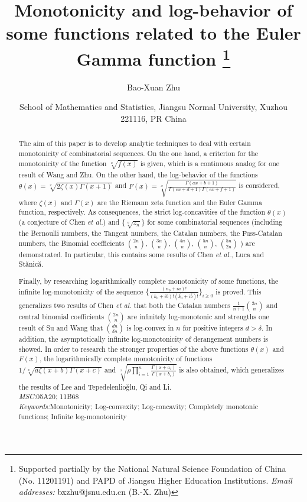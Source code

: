 \documentclass[12pt,reqno]{article}
\title{Monotonicity and log-behavior of some functions related to the Euler Gamma function
\thanks{Supported partially by the National Natural Science Foundation of China (No.
11201191) and PAPD of Jiangsu Higher Education Institutions.
\newline\hspace*{5mm}
   {\it Email addresses:} bxzhu@jsnu.edu.cn (B.-X. Zhu)}}
\author{Bao-Xuan Zhu}
\date{\footnotesize School of Mathematics and Statistics,
         Jiangsu Normal University,
         Xuzhou 221116, PR China}
\theoremstyle{definition}
\numberwithin{equation}{section}
\begin{document}
\maketitle

\begin{abstract}
The aim of this paper is to develop analytic techniques to deal with
certain monotonicity of combinatorial sequences. On the one hand, a
criterion for the monotonicity of the function $\sqrt[x]{f(x)}$ is
given, which is a continuous analog for one result of Wang and Zhu.
On the other hand, the log-behavior of the functions
$\theta(x)=\sqrt[x]{2 \zeta(x)\Gamma(x+1)}$ and
$F(x)=\sqrt[x]{\frac{\Gamma(ax+b+1)}{\Gamma(c x+d+1)\Gamma(e
x+f+1)}}$ is considered, where $\zeta(x)$ and $\Gamma(x)$ are the
Riemann zeta function and the Euler Gamma function, respectively. As
consequences, the strict log-concavities of the function $\theta(x)$
(a conjecture of Chen {\it et al.}) and $\{\sqrt[n]{z_n}\}$ for some
combinatorial sequences (including the Bernoulli numbers, the
Tangent numbers, the Catalan numbers, the Fuss-Catalan numbers, the
Binomial coefficients $\binom{2n}{n}$, $\binom{3n}{n}$,
$\binom{4n}{n}$, $\binom{5n}{n}$, $\binom{5n}{2n}$ ) are
demonstrated. In particular, this contains some results of Chen {\it
et al.}, Luca and St\u{a}nic\u{a}.

Finally, by researching logarithmically complete monotonicity of
some functions, the infinite log-monotonicity of the sequence
$\{\frac{(n_{0}+ia)!}{(k_0+ib)!(\overline{k_0}+i\overline{b})!}\}_{i\geq0}$
is proved. This generalizes two results of Chen {\it et al.} that
both the Catalan numbers $\frac{1}{n+1}\binom{2n}{n}$ and central
binomial coefficients $\binom{2n}{n}$ are infinitely log-monotonic
and strengths one result of Su and Wang that $\binom{dn}{\delta n}$
is log-convex in $n$ for positive integers $d>\delta$. In addition,
the asymptotically infinite log-monotonicity of derangement numbers
is showed. In order to research the stronger properties of the above
functions $\theta(x)$ and $F(x)$, the logarithmically complete
monotonicity of functions $1/\sqrt[x]{a \zeta(x+b)\Gamma(x+c)}$ and
$\sqrt[x]{\rho\prod_{i=1}^n\frac{\Gamma(x+a_i)}{\Gamma(x+b_i)}}$ is
also obtained, which generalizes the results of Lee and
Tepedelenlio\v{g}lu, Qi and Li.
\bigskip\\
{\sl MSC:}\quad 05A20; 11B68
\\
{\sl Keywords:}\quad Monotonicity; Log-convexity; Log-concavity;
Completely monotonic functions; Infinite log-monotonicity
\end{abstract}
\end{document}
